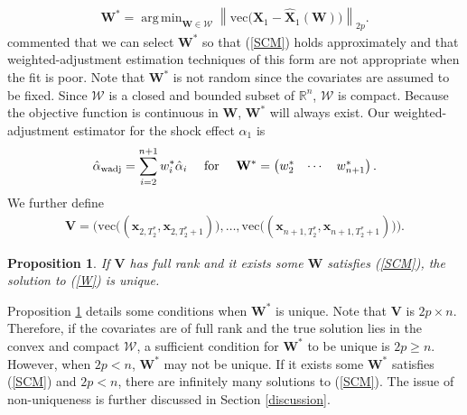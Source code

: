 \documentclass[11pt]{article}
\def\mbf#1{\mathbf{#1}} %
\def\mrm#1{\mathrm{#1}} %
\newcommand{\reals}{\mathbb{R}} %
\def\mc#1{\mathcal{#1}} %
\DeclareMathOperator*{\argmin}{arg\,min} %
\newcommand{\norm}[1]{\left\lVert#1\right\rVert} %
\newtheorem{prop}{Proposition}
\theoremstyle{definition}
\begin{document}
\begin{align}
  \mbf{W}^* = \argmin_{\mbf{W}\in \mc{W}} \norm{\mrm{vec}\big(\mbf{X}_1-\hat{\mbf{X}}_1(\mbf{W})\big)}_{2p}. 
  \label{W}
\end{align}
\cite{abadie2010synthetic} commented that we can select $\mbf{W}^*$ 
so that (\ref{SCM}) holds approximately %
and that weighted-adjustment estimation techniques of this form are not 
appropriate when the fit is poor. 
Note that $\mbf{W}^*$ is not random since the covariates are assumed to be fixed. Since $\mc{W}$ is a closed and bounded subset of $\reals^n$,  $\mc{W}$ is compact. Because the objective function 
is continuous in $\mbf{W}$, $\mbf{W}^*$ will always exist. %
Our weighted-adjustment estimator for the shock effect $\alpha_1$ is
  \begin{align*}
    \hat{\alpha}_{\rm wadj} = \sum_{i=2}^{n+1} w_i^*\hat{\alpha}_i
    \quad \text{ for } \quad \mbf{W}^* = \begin{pmatrix}
      w^*_2 & \cdots & w^*_{n+1}
    \end{pmatrix}.
  \end{align*}
 We further define
\begin{align*}
  \mathbf{V} = \Big(\mrm{vec}\big((\mathbf{x}_{2, T_2^*}, \mathbf{x}_{2, T_2^*+1})\big), \ldots, \mrm{vec}\big((\mathbf{x}_{n+1, T_2^*}, \mathbf{x}_{n+1, T_2^*+1})\big)\Big).
\end{align*}
\begin{prop}
  \label{uniqueness} If $\mathbf{V}$ has full rank and it exists some $\mathbf{W}$ satisfies (\ref{SCM}), the solution to  (\ref{W}) is unique.
\end{prop} 
Proposition \ref{uniqueness} details some conditions when $\mathbf{W}^*$ is unique.  Note that $\mathbf{V}$ is $2p \times n$. Therefore, if the covariates are of full rank and the true solution lies in the convex and compact $\mathcal{W}$, a sufficient condition for $\mathbf{W}^*$ to be unique is $2p \geq n$. However, when $2p < n$, $\mathbf{W}^*$ may not be unique. If it exists some $\mathbf{W}^*$ satisfies (\ref{SCM}) and $2p < n$, there are infinitely many solutions to (\ref{SCM}).  The issue of non-uniqueness is further discussed in Section \ref{discussion}.
\end{document}
